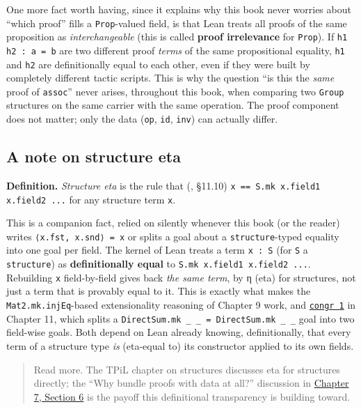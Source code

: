 One more fact worth having, since it explains why this book never worries about ``which proof'' fills a \texttt{Prop}-valued field, is that Lean treats all proofs of the same proposition as \emph{interchangeable} (this is called \textbf{proof irrelevance} for \texttt{Prop}). If \texttt{h1 h2 : a = b} are two different proof \emph{terms} of the same propositional equality, \texttt{h1} and \texttt{h2} are definitionally equal to each other, even if they were built by completely different tactic scripts. This is why the question ``is this the \emph{same} proof of \texttt{assoc}'' never arises, throughout this book, when comparing two \texttt{Group} structures on the same carrier with the same operation. The proof component does not matter; only the data (\texttt{op}, \texttt{id}, \texttt{inv}) can actually differ.

\subsection{A note on structure eta}\label{sec:06-rigor-check:04-defeq-vs-propeq:6}

\textbf{Definition.} \emph{Structure eta} is the rule that (\cite{TPIL4}, §11.10) \texttt{x == S.mk x.field1 x.field2 ...} for any structure term \texttt{x}.

This is a companion fact, relied on silently whenever this book (or the reader) writes \texttt{⟨x.fst, x.snd⟩ = x} or splits a goal about a \texttt{structure}-typed equality into one goal per field. The kernel of Lean treats a term \texttt{x : S} (for \texttt{S} a \texttt{structure}) as \textbf{definitionally equal} to \texttt{S.mk x.field1 x.field2 ...}. Rebuilding \texttt{x} field-by-field gives back \emph{the same term}, by η (eta) for structures, not just a term that is provably equal to it. This is exactly what makes the \texttt{Mat2.mk.injEq}-based extensionality reasoning of Chapter 9 work, and \href{https://lean-lang.org/doc/reference/latest/Tactic-Proofs/Tactic-Reference/}{\texttt{congr 1}} in Chapter 11, which splits a \texttt{DirectSum.mk \_\allowbreak{} \_\allowbreak{} = DirectSum.mk \_\allowbreak{} \_\allowbreak{}} goal into two field-wise goals. Both depend on Lean already knowing, definitionally, that every term of a structure type \emph{is} (eta-equal to) its constructor applied to its own fields.

\begin{quote}
Read more. The TPiL chapter on structures discusses eta for structures directly; the ``Why bundle proofs with data at all?'' discussion in \hyperref[sec:07-groups:06-why-bundle:1]{Chapter 7, Section 6} is the payoff this definitional transparency is building toward.
\end{quote}

